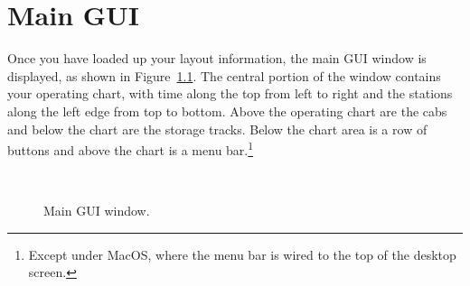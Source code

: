 
\chapter{Main GUI}
\label{chapt:MainGUI}

Once you have loaded up your layout information, the main GUI window is
displayed, as shown in Figure~\ref{fig:mrrTTMain}.  The central portion
of the window contains your operating chart, with time along the top
from left to right and the stations along the left edge from top to
bottom.  Above the operating chart are the cabs and below the chart are
the storage tracks.  Below the chart area is a row of buttons and above
the chart is a menu bar.\footnote{Except under MacOS, where the menu bar
is wired to the top of the desktop screen.}

\begin{figure}
\begin{centering}
\\
\caption{Main GUI window.}
\label{fig:mrrTTMain}
\end{centering}
\end{figure}

